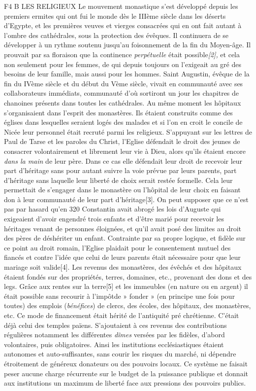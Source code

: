 F4 B LES RELIGIEUX
 Le mouvement monastique s'est développé depuis les premiers ermites qui ont fui le monde dès le IIIème siècle dans les déserts d'Egypte, et les premières veuves et vierges consacrées qui en ont fait autant à l'ombre des cathédrales, sous la protection des évêques. Il continuera de se développer à un rythme soutenu jusqu'au foisonnement de la fin du Moyen-âge. Il prouvait par sa floraison que la continence \emph{perpétuelle} était possible\emph{[2],} et cela non seulement pour les femmes, de qui depuis toujours on l'exigeait au gré des besoins de leur famille, mais aussi pour les hommes. Saint Augustin, évêque de la fin du IVème siècle et du début du Vème siècle, vivait en communauté avec ses collaborateurs immédiats, communauté d'où sortiront un jour les chapitres de chanoines présents dans toutes les cathédrales. Au même moment les hôpitaux s'organisaient dans l'esprit des monastères. Ils étaient construits comme des églises dans lesquelles seraient logés des malades et si l'on en croit le concile de Nicée leur personnel était recruté parmi les religieux.
 S'appuyant sur les lettres de Paul de Tarse et les paroles du Christ, l'Eglise défendait le droit des jeunes de consacrer volontairement et librement leur vie à Dieu, alors qu'ils étaient encore \emph{dans la main} de leur père. Dans ce cas elle défendait leur droit de recevoir leur part d'héritage sans pour autant suivre la voie prévue par leurs parents, part d'héritage sans laquelle leur liberté de choix serait restée formelle. Cela leur permettait de s'engager dans le monastère ou l'hôpital de leur choix en faisant don à leur communauté de leur part d'héritage[3]. On peut supposer que ce n'est pas par hasard qu'en 320 Constantin avait abrogé les lois d'Auguste qui exigeaient d'avoir engendré trois enfants et d'être marié pour recevoir les héritages venant de personnes éloignées, et qu'il avait posé des limites au droit des pères de déshériter un enfant. Contrainte par sa propre logique, et fidèle sur ce point au droit romain, l'Eglise plaidait pour le consentement mutuel des fiancés et contre l'idée que celui de leurs parents était nécessaire pour que leur mariage soit valide[4].
 Les revenus des monastères, des évêchés et des hôpitaux étaient fondés sur des propriétés, terres, domaines, etc., provenant des dons et des legs. Grâce aux rentes sur la terre[5] et les immeubles (en nature ou en argent) il était possible sans recourir à l'impôt\emph{}de » fonder » (en principe une fois pour toutes) des emplois (\emph{bénéfices}) de clercs, des écoles, des hôpitaux, des monastères, etc. Ce mode de financement était hérité de l'antiquité pré chrétienne. C'était déjà celui des temples païens. S'ajoutaient à ces revenus des contributions régulières notamment les différentes \emph{dîmes} versées par les fidèles, d'abord volontaires, puis obligatoires. Ainsi les institutions ecclésiastiques étaient autonomes et auto-suffisantes, sans courir les risques du marché, ni dépendre étroitement de généreux donateurs ou des pouvoirs locaux. Ce système ne faisait peser aucune charge récurrente sur le budget de la puissance publique et donnait aux institutions un maximum de liberté face aux pressions des pouvoirs publics. 

